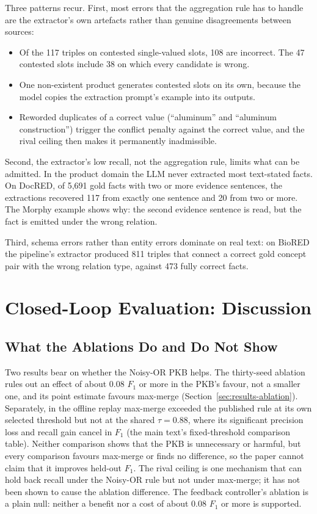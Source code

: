 \documentclass[11pt]{article}
\begin{document}
Three patterns recur. First, most errors that the aggregation rule has
to handle are the extractor's own artefacts rather than genuine
disagreements between sources:
\begin{itemize}
\item Of the 117 triples on contested single-valued slots, 108 are
incorrect. The 47 contested slots include 38 on which every candidate is
wrong.
\item One non-existent product generates contested slots on its own,
because the model copies the extraction prompt's example into its
outputs.
\item Reworded duplicates of a correct value (``aluminum'' and
``aluminum construction'') trigger the conflict penalty against the
correct value, and the rival ceiling then makes it permanently
inadmissible.
\end{itemize}

Second, the extractor's low recall, not the aggregation rule, limits
what can be admitted. In the product domain the LLM never extracted most
text-stated facts. On DocRED, of 5,691 gold facts with two or more
evidence sentences, the extractions recovered 117 from exactly one
sentence and 20 from two or more. The Morphy example shows why: the
second evidence sentence is read, but the fact is emitted under the
wrong relation.

Third, schema errors rather than entity errors dominate on real text:
on BioRED the pipeline's extractor produced 811 triples that connect a
correct gold concept pair with the wrong relation type, against 473
fully correct facts.


\section{Closed-Loop Evaluation: Discussion}
\label{sec:s17}

\subsection{What the Ablations Do and Do Not Show}
\label{sec:discussion-ablations}

Two results bear on whether the Noisy-OR PKB helps. The thirty-seed
ablation rules out an effect of about $0.08$ $F_1$ or more in the PKB's
favour, not a smaller one, and its point estimate favours max-merge
(Section~\ref{sec:results-ablation}). Separately, in the offline replay max-merge exceeded the
published rule at its own selected threshold but not at the shared
$\tau=0.88$, where its significant precision loss and recall gain cancel
in $F_1$ (the main text's fixed-threshold comparison table). Neither comparison
shows that the PKB is unnecessary or harmful, but every comparison
favours max-merge or finds no difference, so the paper cannot claim that
it improves held-out $F_1$. The rival ceiling is one mechanism that can
hold back recall under the Noisy-OR rule but not under max-merge; it has
not been shown to cause the ablation difference. The feedback
controller's ablation is a plain null: neither a benefit nor a cost of
about $0.08$ $F_1$ or more is supported.
\end{document}
